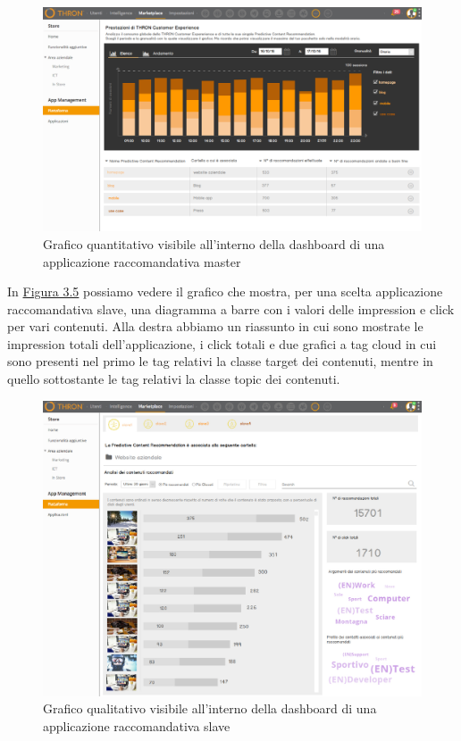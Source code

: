 \documentclass[a4paper, 12pt, twoside, openright]{book}
\begin{document}
\begin{figure}[H]
	\centering
	\label{grafico-quantitativo}
	\includegraphics[width=1.0\textwidth]{images/grafico-quantitativo.jpg}
	\caption{Grafico quantitativo visibile all'interno della dashboard di una applicazione raccomandativa master}
\end{figure}
In \hyperref[grafico-qualitativo-1]{Figura 3.5} possiamo vedere il grafico che mostra, per una scelta applicazione raccomandativa slave, una diagramma a barre con i valori delle impression e click per vari contenuti. Alla destra abbiamo un riassunto in cui sono mostrate le impression totali dell'applicazione, i click totali e due grafici a tag cloud in cui sono presenti nel primo le tag relativi la classe target dei contenuti, mentre in quello sottostante le tag relativi la classe topic dei contenuti. 
\begin{figure}[H]
	\centering
	\label{grafico-qualitativo-1}
	\includegraphics[width=1.0\textwidth]{images/grafico-qualitativo-1.jpg}
	\caption{Grafico qualitativo visibile all'interno della dashboard di una applicazione raccomandativa slave}
\end{figure}
\end{document}
